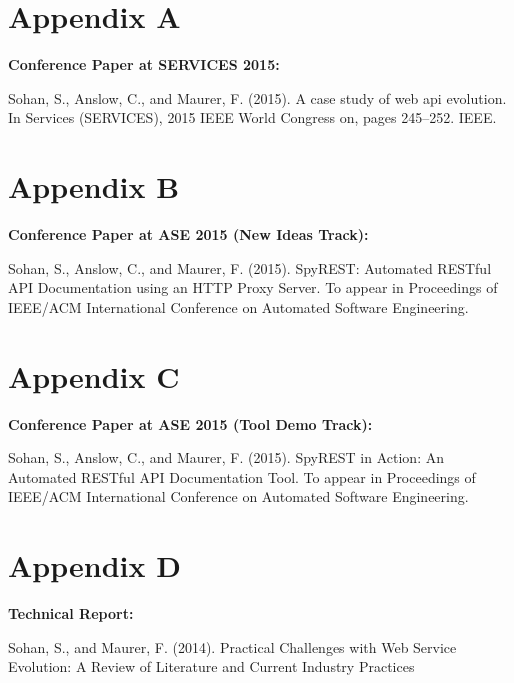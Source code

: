 \documentclass[11pt,oneside]{book}
\begin{document}
\begin{appendices}

\chapter{Appendix A}

\textbf{Conference Paper at SERVICES 2015:}

Sohan, S., Anslow, C., and Maurer, F. (2015). A case study of web api evolution. In Services (SERVICES), 2015 IEEE World Congress on, pages 245–252. IEEE.

\chapter{Appendix B}

\textbf{Conference Paper at ASE 2015 (New Ideas Track):}

Sohan, S., Anslow, C., and Maurer, F. (2015). SpyREST: Automated RESTful API Documentation using an HTTP Proxy Server. To appear in Proceedings of IEEE/ACM International Conference on Automated Software Engineering.

\chapter{Appendix C}

\textbf{Conference Paper at ASE 2015 (Tool Demo Track):}

Sohan, S., Anslow, C., and Maurer, F. (2015). SpyREST in Action: An Automated RESTful API Documentation Tool. To appear in Proceedings of IEEE/ACM International Conference on Automated Software Engineering.

\chapter{Appendix D}

\textbf{Technical Report:}

Sohan, S., and Maurer, F. (2014). Practical Challenges with Web Service Evolution: A Review of Literature and Current Industry Practices
\end{appendices}
\end{document}
